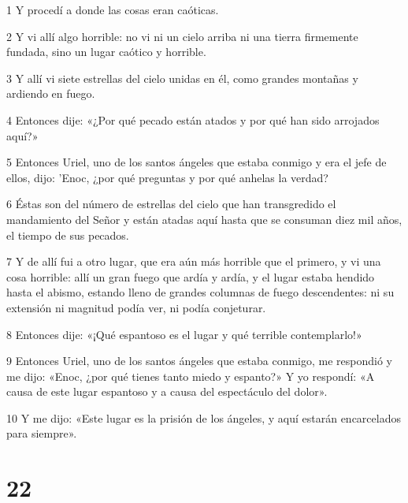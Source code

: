 \par 1 Y procedí a donde las cosas eran caóticas.
\par 2 Y vi allí algo horrible: no vi ni un cielo arriba ni una tierra firmemente fundada, sino un lugar caótico y horrible.
\par 3 Y allí vi siete estrellas del cielo unidas en él, como grandes montañas y ardiendo en fuego.
\par 4 Entonces dije: «¿Por qué pecado están atados y por qué han sido arrojados aquí?»
\par 5 Entonces Uriel, uno de los santos ángeles que estaba conmigo y era el jefe de ellos, dijo: 'Enoc, ¿por qué preguntas y por qué anhelas la verdad?
\par 6 Éstas son del número de estrellas del cielo que han transgredido el mandamiento del Señor y están atadas aquí hasta que se consuman diez mil años, el tiempo de sus pecados.
\par 7 Y de allí fui a otro lugar, que era aún más horrible que el primero, y vi una cosa horrible: allí un gran fuego que ardía y ardía, y el lugar estaba hendido hasta el abismo, estando lleno de grandes columnas de fuego descendentes: ni su extensión ni magnitud podía ver, ni podía conjeturar.
\par 8 Entonces dije: «¡Qué espantoso es el lugar y qué terrible contemplarlo!»
\par 9 Entonces Uriel, uno de los santos ángeles que estaba conmigo, me respondió y me dijo: «Enoc, ¿por qué tienes tanto miedo y espanto?» Y yo respondí: «A causa de este lugar espantoso y a causa del espectáculo del dolor».
\par 10 Y me dijo: «Este lugar es la prisión de los ángeles, y aquí estarán encarcelados para siempre».

\chapter{22}

